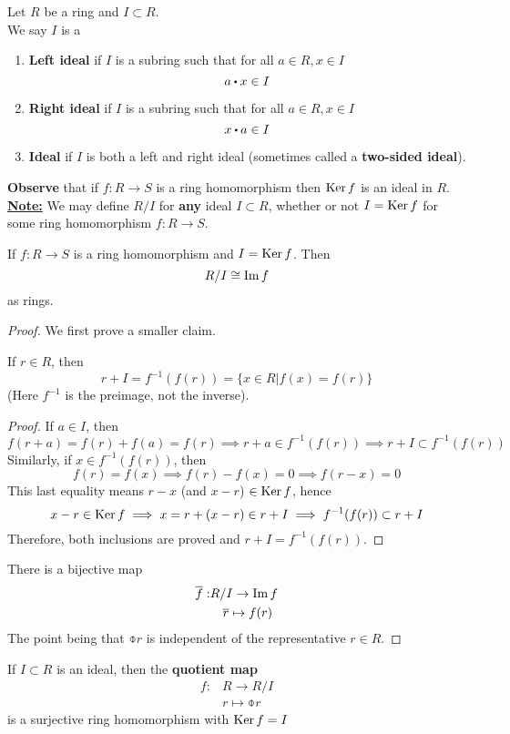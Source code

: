 \documentclass[../Main.tex]{subfiles}
\begin{document}
\begin{dfn}[title=Ideal]
	Let $R$ be a ring and $I\subset R$.\\
	We say $I$ is a 
	\begin{enumerate}[label=(\roman*)]
		\item \textbf{Left ideal} if $I$ is a subring such that for all $a\in R, x\in I$
		\[a\rdot x \in I\]
		\item \textbf{Right ideal} if $I$ is a subring such that for all $a\in R, x\in I$
		\[x\rdot a \in I\]
		\item \textbf{Ideal} if $I$ is both a left and right ideal (sometimes called a \textbf{two-sided ideal}).
	\end{enumerate}
\end{dfn}
\textbf{Observe} that if $f:R\to S$ is a ring homomorphism then $\operatorname{Ker} f$ is an ideal in $R$.\\
\underline{\textbf{Note:}} We may define $R/I$ for \textbf{any} ideal $I\subset R$, whether or not $I=\operatorname{Ker} f$ for some ring homomorphism $f:R\to S$.
\newpage
\begin{thm}[title = The First Isomorphism Theorem]
	If $f:R\to S$ is a ring homomorphism and $I=\operatorname{Ker} f$. Then
	\[R/I\cong \operatorname{Im} f\]
	as rings.
\end{thm}
\begin{proof}
	We first prove a smaller claim.
	\begin{claim}
		If $r \in R$, then  \[r+I = f^{-1}(f(r)) =\{x\in R|f(x)=f(r)\}\]
	(Here $f^{-1}$ is the preimage, not the inverse).
	\end{claim}
	\begin{proof}
		If $a\in I$, then 
		\[f(r+a)=f(r)+f(a)=f(r) \implies r+a \in f^{-1}(f(r)) \implies r+I \subset f^{-1}(f(r))\]
		Similarly, if $x\in f^{-1}(f(r))$, then
		\[f(r)=f(x)\implies f(r)-f(x)=0\implies f(r-x)=0\]
		This last equality means $r-x$ (and $x-r$) $\in \operatorname{Ker} f$, hence
		\[x-r\in \operatorname{Ker} f \implies x = r+(x-r)\in r+I \implies
		f^{-1}(f(r)) \subset r+I \]
		Therefore, both inclusions are proved and $r+I =f^{-1}(f(r))$.
	\end{proof}
	There is a bijective map
	\begin{align*}
		\overline{f}:& R/I \to \operatorname{Im} f \\
		&\quad \overline{r} \mapsto f(r)
	\end{align*}
	The point being that $\obar{r}$ is independent of the representative $r\in R$.
\end{proof}
\begin{thm}[title = Canonical quotient map is surjective]
	If $I\subset R$ is an ideal, then the \textbf{quotient map}
	\begin{align*}
		f:&R \to R/I\\
		&r\mapsto \obar{r}
	\end{align*}
	is a surjective ring homomorphism with $\operatorname{Ker} f = I$
\end{thm}
\end{document}
